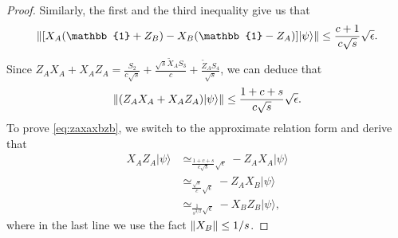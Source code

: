 \documentclass[11pt,letterpaper]{article}
\newcommand{\ket}[1]{|#1\rangle}
\DeclarePairedDelimiter{\norm}{\lVert}{\rVert}
\newcommand{\1}{\mathbb{1}}
\newcommand{\se}{\sqrt{\epsilon}}
\newcommand{\appd}[1]{\simeq_{#1}}
\theoremstyle{definition}
\begin{document}
\begin{proof}
Similarly, the first and the third inequality give us that 
\begin{align}
	\norm{[X_A(\1+Z_B) - X_B(\1-Z_A)] \ket{\psi}} \leq \frac{c+1}{c\sqrt{s}} \se.
\end{align}
Since $Z_AX_A +X_A Z_A = \frac{S_2}{c\sqrt{s}} + \frac{\sqrt{s}\tilde{X}_AS_3}{c} + \frac{\tilde{Z}_AS_4}{\sqrt{s}}$, we can deduce that
\begin{align}
	\norm{ (Z_A X_A+X_AZ_A)\ket{\psi}} \leq \frac{1+c+s}{c\sqrt{s}} \se.
\end{align}
To prove \cref{eq:zaxaxbzb}, we switch to the approximate relation form and derive that 
\begin{align}
	X_AZ_A \ket{\psi} &\appd{\frac{1+c+s}{c\sqrt{s}} \se}  -Z_AX_A \ket{\psi} \\
	&\appd{\frac{\sqrt{s}}{c} \se} -Z_AX_B \ket{\psi} \\
	&\appd{\frac{1}{s^{3/2} }\se} -X_BZ_B\ket{\psi},
\end{align}
where in the last line we use the fact $\norm{X_B} \leq 1/s$.


\end{proof}
\end{document}
